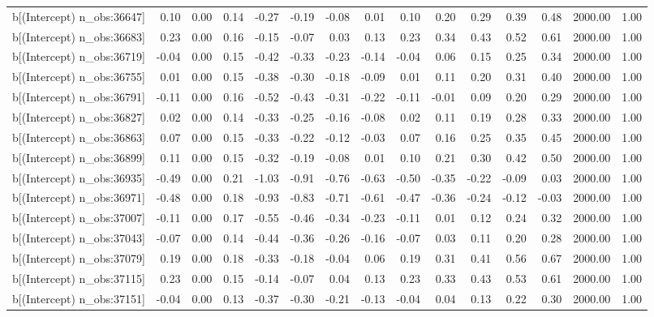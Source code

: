 \begin{table}[ht]
\begin{tabular}{rrrrrrrrrrrrrrr}
  b[(Intercept) n\_obs:36647] & 0.10 & 0.00 & 0.14 & -0.27 & -0.19 & -0.08 & 0.01 & 0.10 & 0.20 & 0.29 & 0.39 & 0.48 & 2000.00 & 1.00 \\ 
  b[(Intercept) n\_obs:36683] & 0.23 & 0.00 & 0.16 & -0.15 & -0.07 & 0.03 & 0.13 & 0.23 & 0.34 & 0.43 & 0.52 & 0.61 & 2000.00 & 1.00 \\ 
  b[(Intercept) n\_obs:36719] & -0.04 & 0.00 & 0.15 & -0.42 & -0.33 & -0.23 & -0.14 & -0.04 & 0.06 & 0.15 & 0.25 & 0.34 & 2000.00 & 1.00 \\ 
  b[(Intercept) n\_obs:36755] & 0.01 & 0.00 & 0.15 & -0.38 & -0.30 & -0.18 & -0.09 & 0.01 & 0.11 & 0.20 & 0.31 & 0.40 & 2000.00 & 1.00 \\ 
  b[(Intercept) n\_obs:36791] & -0.11 & 0.00 & 0.16 & -0.52 & -0.43 & -0.31 & -0.22 & -0.11 & -0.01 & 0.09 & 0.20 & 0.29 & 2000.00 & 1.00 \\ 
  b[(Intercept) n\_obs:36827] & 0.02 & 0.00 & 0.14 & -0.33 & -0.25 & -0.16 & -0.08 & 0.02 & 0.11 & 0.19 & 0.28 & 0.33 & 2000.00 & 1.00 \\ 
  b[(Intercept) n\_obs:36863] & 0.07 & 0.00 & 0.15 & -0.33 & -0.22 & -0.12 & -0.03 & 0.07 & 0.16 & 0.25 & 0.35 & 0.45 & 2000.00 & 1.00 \\ 
  b[(Intercept) n\_obs:36899] & 0.11 & 0.00 & 0.15 & -0.32 & -0.19 & -0.08 & 0.01 & 0.10 & 0.21 & 0.30 & 0.42 & 0.50 & 2000.00 & 1.00 \\ 
  b[(Intercept) n\_obs:36935] & -0.49 & 0.00 & 0.21 & -1.03 & -0.91 & -0.76 & -0.63 & -0.50 & -0.35 & -0.22 & -0.09 & 0.03 & 2000.00 & 1.00 \\ 
  b[(Intercept) n\_obs:36971] & -0.48 & 0.00 & 0.18 & -0.93 & -0.83 & -0.71 & -0.61 & -0.47 & -0.36 & -0.24 & -0.12 & -0.03 & 2000.00 & 1.00 \\ 
  b[(Intercept) n\_obs:37007] & -0.11 & 0.00 & 0.17 & -0.55 & -0.46 & -0.34 & -0.23 & -0.11 & 0.01 & 0.12 & 0.24 & 0.32 & 2000.00 & 1.00 \\ 
  b[(Intercept) n\_obs:37043] & -0.07 & 0.00 & 0.14 & -0.44 & -0.36 & -0.26 & -0.16 & -0.07 & 0.03 & 0.11 & 0.20 & 0.28 & 2000.00 & 1.00 \\ 
  b[(Intercept) n\_obs:37079] & 0.19 & 0.00 & 0.18 & -0.33 & -0.18 & -0.04 & 0.06 & 0.19 & 0.31 & 0.41 & 0.56 & 0.67 & 2000.00 & 1.00 \\ 
  b[(Intercept) n\_obs:37115] & 0.23 & 0.00 & 0.15 & -0.14 & -0.07 & 0.04 & 0.13 & 0.23 & 0.33 & 0.43 & 0.53 & 0.61 & 2000.00 & 1.00 \\ 
  b[(Intercept) n\_obs:37151] & -0.04 & 0.00 & 0.13 & -0.37 & -0.30 & -0.21 & -0.13 & -0.04 & 0.04 & 0.13 & 0.22 & 0.30 & 2000.00 & 1.00 \\ 

\end{tabular}
\end{table}
